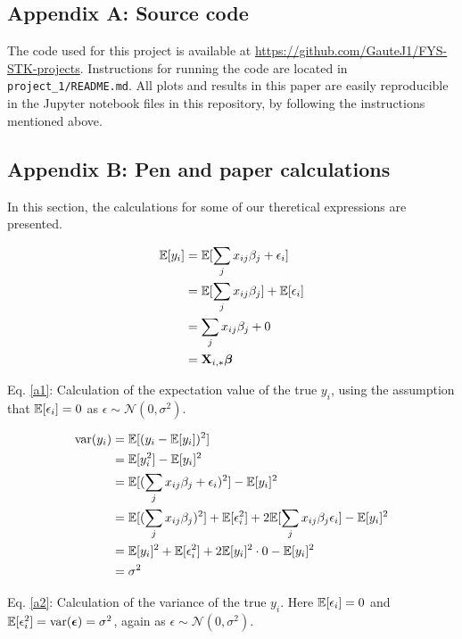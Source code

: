 \subsection{Appendix A: Source code} \label{appendixA}
The code used for this project is available at \url{https://github.com/GauteJ1/FYS-STK-projects}. Instructions for running the code are located in \texttt{ project\_1/README.md}. All plots and results in this paper are easily reproducible in the Jupyter notebook files in this repository, by following the instructions mentioned above.

\subsection{Appendix B: Pen and paper calculations}\label{appendixB}

In this section, the calculations for some of our theretical expressions are presented. 

\begin{align}\label{a1}
    \mathbb{E}[y_i] & = \mathbb{E}[\sum_j x_{ij}\beta_j + \epsilon_i] \nonumber \\
    & = \mathbb{E}[\sum_j x_{ij}\beta_j] + \mathbb{E}[\epsilon_i] \nonumber \\ 
    & = \sum_j x_{ij}\beta_j + 0 \nonumber \\
    & = \mathbf{X}_{i,*}\boldsymbol{\beta}
\end{align}

Eq. \ref{a1}: Calculation of the expectation value of the true $y_i$, using the assumption that $\mathbb{E}[\epsilon_i] = 0$ as $\epsilon \sim  
\mathcal{N}(0,\sigma^2)$. 



\begin{align}\label{a2}
    \text{var}(y_i) & = \mathbb{E}[(y_i -\mathbb{E}[y_i])^2] \nonumber \\
    & = \mathbb{E}[y_i^2] - \mathbb{E}[y_i]^2 \nonumber \\ 
    & = \mathbb{E}[(\sum_j x_{ij}\beta_j + \epsilon_i)^2] - \mathbb{E}[y_i]^2 \nonumber \\
    & = \mathbb{E}[(\sum_j x_{ij}\beta_j)^2] + \mathbb{E}[\epsilon_i^2] + 2\mathbb{E}[\sum_j x_{ij}\beta_j \epsilon_i ] - \mathbb{E}[y_i]^2 \nonumber \\
    & = \mathbb{E}[y_i]^2 + \mathbb{E}[\epsilon_i^2] + 2\mathbb{E}[y_i]^2\cdot 0 - \mathbb{E}[y_i]^2 \nonumber \\ 
    & = \sigma^2
\end{align}

Eq. \ref{a2}: Calculation of the variance of the true $y_i$. Here $\mathbb{E}[\epsilon_i] = 0$ and $\mathbb{E}[\epsilon_i^2] = \text{var}(\boldsymbol{\epsilon}) = \sigma^2$, again as $\epsilon \sim  
\mathcal{N}(0,\sigma^2)$.

